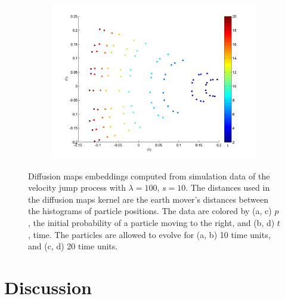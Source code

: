 \documentclass[prl, reprint, final]{revtex4-1}
\begin{document}
\begin{figure}
\begin{subfigure}{0.4\textwidth}
\caption{}
\end{subfigure}
\begin{subfigure}{0.4\textwidth}
\includegraphics[width=\textwidth]{EMD2_t_20}
\caption{}
\end{subfigure}
\caption{Diffusion maps embeddings computed from simulation data of the velocity jump process with $\lambda=100$, $s=10$. The distances used in the diffusion maps kernel are the earth mover's distances between the histograms of particle positions. The data are colored by (a, c) $p$, the initial probability of a particle moving to the right, and (b, d) $t$, time. The particles are allowed to evolve for (a, b) 10 time units, and (c, d) 20 time units. } 
\label{fig:dmaps_embed_varyt}
\end{figure}

\section{Discussion}



\end{document}
